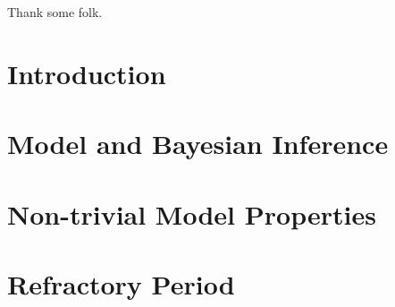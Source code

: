 \documentclass[oneside, 12 pt]{book}
\begin{document}
\newpage


 \vspace{3cm}
 
 
 \\ \\
Thank some folk.

\tableofcontents
\listoffigures
\listoftables
\mainmatter
\pagestyle{fancy}
\chapter{Introduction}
 
 
\chapter{Model and Bayesian Inference}\label{chapter 2}
 


\chapter{Non-trivial Model Properties}\label{chapter 3}



\chapter{Refractory Period}\label{chapter 4}


\end{document}
